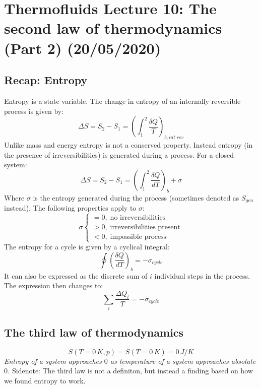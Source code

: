 \documentclass[11pt, a4paper]{article}
\begin{document}
\setcounter{section}{9}
\setcounter{equation}{0}
\section{Thermofluids Lecture 10: The second law of thermodynamics (Part 2) (20/05/2020)}


\subsection{Recap: Entropy}
Entropy is a state variable. The change in entropy of an internally reversible process is given by:
\begin{equation}
  \Delta S = S_2 - S_1 = \left( \int_1^2 \frac{\delta Q}{T} \right)_{b, int\;rev} 
\end{equation}
Unlike mass and energy entropy is not a conserved property. Instead entropy (in the presence of irreversibilities) is generated during a process. For a closed system:
\begin{equation}
  \Delta S = S_2 - S_1 = \left( \int_1^2 \frac{\delta Q}{dT} \right)_b + \sigma
\end{equation}
Where $\sigma$ is the entropy generated during the process (sometimes denoted as $S_{gen}$ instead). The following properties apply to $\sigma$:
\begin{equation}
  \sigma
  \begin{cases}
    = 0,\;\text{no irreversibilities}\\
    > 0,\;\text{irreversibilities present}\\
    < 0,\;\text{impossible process}
  \end{cases}
\end{equation}
The entropy for a cycle is given by a cyclical integral:
\begin{equation}
  \oint \left(\frac{\delta Q}{dT} \right)_b = -\sigma_{cycle}
\end{equation}
It can also be expressed as the discrete sum of $i$ individual steps in the process. The expression then changes to:
\begin{equation}
  \sum_i \frac{\Delta Q_i}{T} = -\sigma_{cycle}
\end{equation}


\subsection{The third law of thermodynamics}
\begin{equation}
  S(T=0\,K, p) = S(T=0\,K) = 0\,J/K
\end{equation}
\textit{Entropy of a system approaches $0$ as temperature of a system approaches absolute $0$.}
Sidenote: The third law is not a definiton, but instead a finding based on how we found entropy to work.
\end{document}
